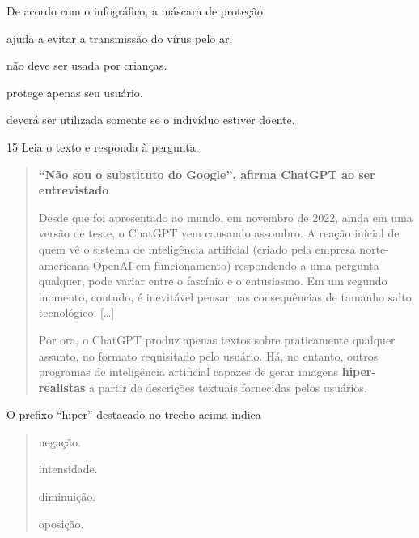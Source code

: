 De acordo com o infográfico, a máscara de proteção

\begin{escolha}
  \item ajuda a evitar a transmissão do vírus pelo ar.

  \item não deve ser usada por crianças.

  \item protege apenas seu usuário.

  \item deverá ser utilizada somente se o indivíduo estiver doente.
\end{escolha}


\num{15} Leia o texto e responda à pergunta.

\begin{quote}
\textbf{``Não sou o substituto do Google'', afirma ChatGPT ao ser entrevistado}

Desde que foi apresentado ao mundo, em novembro de 2022, ainda em uma
versão de teste, o ChatGPT vem causando assombro. A reação inicial de
quem vê o sistema de inteligência artificial (criado pela empresa
norte-americana OpenAI em funcionamento) respondendo a uma pergunta
qualquer, pode variar entre o fascínio e o entusiasmo. Em um segundo
momento, contudo, é inevitável pensar nas consequências de tamanho salto
tecnológico. {[}\ldots{}{]}

Por ora, o ChatGPT produz apenas textos sobre praticamente qualquer
assunto, no formato requisitado pelo usuário. Há, no entanto, outros
programas de inteligência artificial capazes de gerar imagens
\textbf{hiper-realistas} a partir de descrições textuais fornecidas pelos
usuários.
\end{quote}


O prefixo ``hiper'' destacado no trecho acima indica

\begin{quote}
  \item negação.

  \item intensidade.

  \item diminuição.

  \item oposição.
\end{quote}

